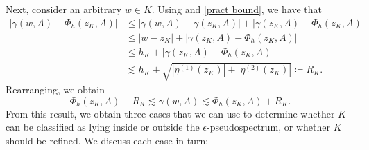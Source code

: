 Next, consider an arbitrary $w \in K.$ Using  and \eqref{pract bound}, we have that
\begin{align}
    | \gamma(w, A) - \Phi_h(z_K, A)| &\le |\gamma(w, A) - \gamma(z_K, A) | + | \gamma(z_K, A) - \Phi_h(z_K, A) |\\
    & \le |w-z_K| + | \gamma(z_K, A) - \Phi_h(z_K, A) | \\
    &\le h_K + | \gamma(z_K, A) - \Phi_h(z_K, A) |\\
    & \lesssim h_K + \sqrt{|\eta^{(1)}(z_K)|+|\eta^{(2)}(z_K)|} \coloneqq R_K. \label{R}
\end{align}
Rearranging, we obtain
\begin{equation}
    \Phi_h(z_K, A) - R_K \lesssim \gamma(w, A) \lesssim \Phi_h(z_K, A) + R_K.
\end{equation}
From this result, we obtain three cases that we can use to determine whether $K$ can be classified as lying inside or outside the $\epsilon$-pseudospectrum, or whether $K$ should be refined. We discuss each case in turn:

